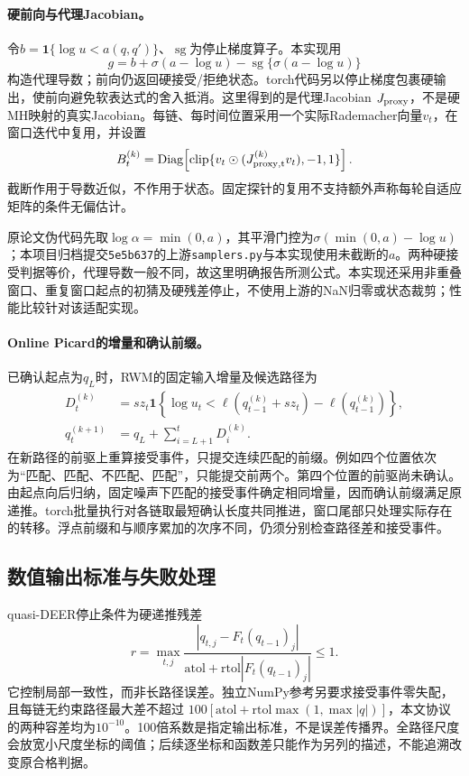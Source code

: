 \documentclass[UTF8,fontset=fandol,zihao=-4]{ctexart}
\newcommand{\ind}{\mathbf{1}}
\begin{document}
\paragraph{硬前向与代理Jacobian。}
令$b=\ind\{\log u<a(q,q')\}$、$\operatorname{sg}$为停止梯度算子。本实现用
\begin{equation}
g=b+\sigma(a-\log u)-\operatorname{sg}\{\sigma(a-\log u)\}
\end{equation}
构造代理导数；前向仍返回硬接受/拒绝状态。torch代码另以停止梯度包裹硬输出，使前向避免软表达式的舍入抵消。这里得到的是代理Jacobian $J_{\rm proxy}$，不是硬MH映射的真实Jacobian。每链、每时间位置采用一个实际Rademacher向量$v_t$，在窗口迭代中复用，并设置
\begin{equation}
B_t^{(k)}=\operatorname{Diag}\!\left[
\operatorname{clip}\{v_t\odot(J_{\rm proxy,t}^{(k)}v_t),-1,1\}\right].
\end{equation}
截断作用于导数近似，不作用于状态。固定探针的复用不支持额外声称每轮自适应矩阵的条件无偏估计。

原论文伪代码先取$\log\alpha=\min(0,a)$，其平滑门控为$\sigma(\min(0,a)-\log u)$\cite{zoltowski}；本项目归档提交\texttt{5e5b637}的上游\texttt{samplers.py}与本实现使用未截断的$a$。两种硬接受判据等价，代理导数一般不同，故这里明确报告所测公式。本实现还采用非重叠窗口、重复窗口起点的初猜及硬残差停止，不使用上游的NaN归零或状态裁剪；性能比较针对该适配实现。

\paragraph{Online Picard的增量和确认前缀。}
已确认起点为$q_L$时，RWM的固定输入增量及候选路径为
\begin{align}
D_t^{(k)}&=s z_t\ind\!\left\{\log u_t<\ell(q_{t-1}^{(k)}+s z_t)-\ell(q_{t-1}^{(k)})\right\},\\
q_t^{(k+1)}&=q_L+\sum_{i=L+1}^{t}D_i^{(k)}.
\end{align}
在新路径的前驱上重算接受事件，只提交连续匹配的前缀。例如四个位置依次为“匹配、匹配、不匹配、匹配”，只能提交前两个。第四个位置的前驱尚未确认。由起点向后归纳，固定噪声下匹配的接受事件确定相同增量，因而确认前缀满足原递推\cite{grazzi}。torch批量执行对各链取最短确认长度共同推进，窗口尾部只处理实际存在的转移。浮点前缀和与顺序累加的次序不同，仍须分别检查路径差和接受事件。

\subsection{数值输出标准与失败处理}
quasi-DEER停止条件为硬递推残差
\begin{equation}
r=\max_{t,j}\frac{|q_{t,j}-F_t(q_{t-1})_j|}{\mathrm{atol}+\mathrm{rtol}|F_t(q_{t-1})_j|}\leq1.
\end{equation}
它控制局部一致性，而非长路径误差。独立NumPy参考另要求接受事件零失配，且每链无约束路径最大差不超过
$100[\mathrm{atol}+\mathrm{rtol}\max(1,\max|q|)]$，本文协议的两种容差均为$10^{-10}$。100倍系数是指定输出标准，不是误差传播界。全路径尺度会放宽小尺度坐标的阈值；后续逐坐标和函数差只能作为另列的描述，不能追溯改变原合格判据。
\end{document}
